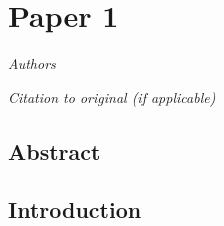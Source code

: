 \chapter{Paper 1} \label{chapter: paper1}

\begin{center}
{\Large \textit{Authors}}

\noindent\textit{Citation to original (if applicable)}
\end{center}

\section*{Abstract}

\section{Introduction}

